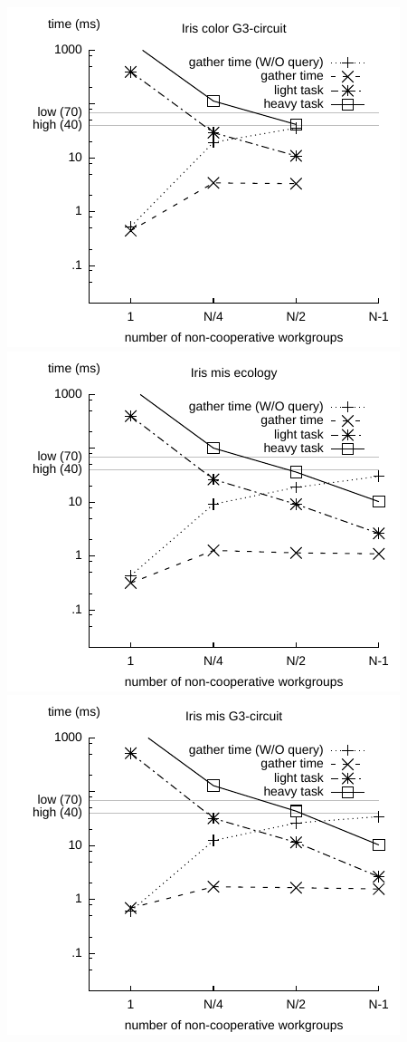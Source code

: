\documentclass[sigconf]{acmart}
\begin{document}
{\includegraphics[width=.7\columnwidth]{images/barrier/iris_color_G3_circuit.pdf} \\
\includegraphics[width=.7\columnwidth]{images/barrier/iris_mis_ecology.pdf} \\
\includegraphics[width=.7\columnwidth]{images/barrier/iris_mis_G3_circuit.pdf} \\
}
\end{document}

